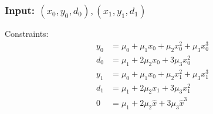 

%

% 
% 
% 
% 


\subsubsection{Input: $(x_0,y_0,d_0),(x_1,y_1,d_1)$}\label{sec:monomial-ydyd}

Constraints:
\begin{equation}
\begin{aligned}
y_0 & = \mu_0 + \mu_1 x_0 + \mu_2 x_0^{2}  + \mu_3 x_0^{3}  
\\
d_0 & = \mu_1 + 2 \mu_2 x_0 + 3 \mu_3 x_0^{2} 
\\
y_1 & = \mu_0 + \mu_1 x_0+\mu_2 x_1^{2}  + \mu_3 x_1^{3}  
\\
d_1 & = \mu_1 + 2 \mu_2 x_1 + 3 \mu_3 x_1^{2} 
\\
0 & = \mu_1 + 2 \mu_2 \hat{x}  + 3 \mu_3 \hat{x}^3  
\end{aligned}
\end{equation}

